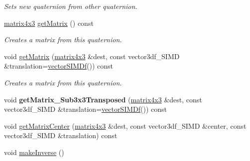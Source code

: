 \begin{DoxyCompactItemize}
\begin{DoxyCompactList}\small\item\em Sets new quaternion from other quaternion. \end{DoxyCompactList}\item 
\hyperlink{classirr_1_1core_1_1matrix4x3}{matrix4x3} \hyperlink{classirr_1_1core_1_1quaternion_a5d7b3a13a8a62d3df9405be6be213934}{get\+Matrix} () const \hypertarget{classirr_1_1core_1_1quaternion_a5d7b3a13a8a62d3df9405be6be213934}{}\label{classirr_1_1core_1_1quaternion_a5d7b3a13a8a62d3df9405be6be213934}

\begin{DoxyCompactList}\small\item\em Creates a matrix from this quaternion. \end{DoxyCompactList}\item 
void \hyperlink{classirr_1_1core_1_1quaternion_a14d7e99f9544a60dee15e1422972c8c3}{get\+Matrix} (\hyperlink{classirr_1_1core_1_1matrix4x3}{matrix4x3} \&dest, const vector3df\+\_\+\+S\+I\+MD \&translation=\hyperlink{classirr_1_1core_1_1vectorSIMDf}{vector\+S\+I\+M\+Df}()) const \hypertarget{classirr_1_1core_1_1quaternion_a14d7e99f9544a60dee15e1422972c8c3}{}\label{classirr_1_1core_1_1quaternion_a14d7e99f9544a60dee15e1422972c8c3}

\begin{DoxyCompactList}\small\item\em Creates a matrix from this quaternion. \end{DoxyCompactList}\item 
void {\bfseries get\+Matrix\+\_\+\+Sub3x3\+Transposed} (\hyperlink{classirr_1_1core_1_1matrix4x3}{matrix4x3} \&dest, const vector3df\+\_\+\+S\+I\+MD \&translation=\hyperlink{classirr_1_1core_1_1vectorSIMDf}{vector\+S\+I\+M\+Df}()) const \hypertarget{classirr_1_1core_1_1quaternion_a1b257345673b71c9a668587f42498b0c}{}\label{classirr_1_1core_1_1quaternion_a1b257345673b71c9a668587f42498b0c}

\item 
void \hyperlink{classirr_1_1core_1_1quaternion_a23c21005eb052ee32ab3771054b3ef84}{get\+Matrix\+Center} (\hyperlink{classirr_1_1core_1_1matrix4x3}{matrix4x3} \&dest, const vector3df\+\_\+\+S\+I\+MD \&center, const vector3df\+\_\+\+S\+I\+MD \&translation) const 
\item 
void \hyperlink{classirr_1_1core_1_1quaternion_a9a0598c6c97fd22b1d3d5e37a0dcc017}{make\+Inverse} ()\hypertarget{classirr_1_1core_1_1quaternion_a9a0598c6c97fd22b1d3d5e37a0dcc017}{}\label{classirr_1_1core_1_1quaternion_a9a0598c6c97fd22b1d3d5e37a0dcc017}


\end{DoxyCompactItemize}
